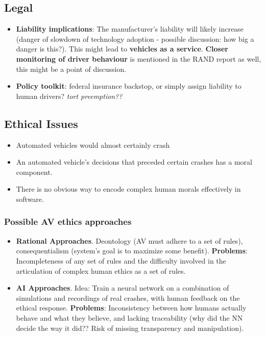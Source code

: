 \documentclass[11pt]{article}
\begin{document}
\subsection{Legal}
\begin{itemize}
\item \textbf{Liability implications}: The manufacturer's liability will likely increase (danger of slowdown of technology adoption - possible discussion: how big a danger is this?). This might lead to \textbf{vehicles as a service}. \textbf{Closer monitoring of driver behaviour} is mentioned in the RAND report as well, this might be a point of discussion.
\item \textbf{Policy toolkit}: federal insurance backstop, or simply assign liability to human drivers? \textit{tort preemption??}
\end{itemize}

\subsection{Ethical Issues}
\begin{itemize}
\item Automated vehicles would almost certainly crash
\item An automated vehicle's decisions that preceded certain crashes has a moral component. 
\item There is no obvious way to encode complex human morals effectively in software. 
\end{itemize}
\cite{Goodall:14}

\subsubsection{Possible AV ethics approaches}

\begin{itemize}
\item \textbf{Rational Approaches}. Deontology (AV must adhere to a set of rules), consequentialism (system's goal is to maximize some benefit). \textbf{Problems}: Incompleteness of any set of rules and the difficulty involved in the articulation of complex human ethics as a set of rules.
\item \textbf{AI Approaches}. Idea: Train a neural network on a combination of simulations and recordings of real crashes, with human feedback on the ethical response. \textbf{Problems}: Inconsistency between how humans actually behave and what they believe, and lacking traceability (why did the NN decide the way it did?? Risk of missing transparency and manipulation).
\end{itemize}
\end{document}
